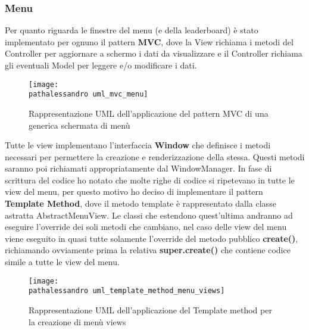 \documentclass[a4paper,12pt]{report}
\newcommand\pathalessandro{img/alessandro/}
\begin{document}
\subsubsection{Menu}
Per quanto riguarda le finestre del menu (e della leaderboard) è stato implementato per ognuno il pattern \textbf{MVC}, dove la View richiama i metodi del Controller
per aggiornare a schermo i dati da visualizzare e il Controller richiama gli eventuali Model per leggere e/o modificare i dati. \\
\begin{figure}[!htb]
	\centerline{\texttt{[image: \\pathalessandro uml\_mvc\_menu]}}
	\caption{Rappresentazione UML dell'applicazione del pattern MVC di una generica schermata di menù}
	\label{img:uml_mvc_menu}
\end{figure}
\clearpage \hfill\break
Tutte le view implementano l'interfaccia \textbf{Window} che definisce i metodi necessari per permettere la creazione e renderizzazione della stessa.
Questi metodi saranno poi richiamati appropriatamente dal WindowManager.
In fase di scrittura del codice ho notato che molte righe di codice si ripetevano in tutte le view del menu, per questo motivo ho deciso di implementare il pattern \textbf{Template Method},
dove il metodo template è rappresentato dalla classe astratta AbstractMenuView. Le classi che estendono quest'ultima andranno ad eseguire l'override dei soli metodi che cambiano, nel caso delle 
view del menu viene eseguito in quasi tutte solamente l'override del metodo pubblico \textbf{create()}, richiamando ovviamente prima la relativa \textbf{super.create()} che contiene
codice simile a tutte le view del menu.
\begin{figure}[!htb]
	\centerline{\texttt{[image: \\pathalessandro uml\_template\_method\_menu\_views]}}
	\caption{Rappresentazione UML dell'applicazione del Template method per la creazione di menù views}
	\label{img:uml_template_method_menu_views}
\end{figure}
\clearpage \hfill\break
\end{document}
